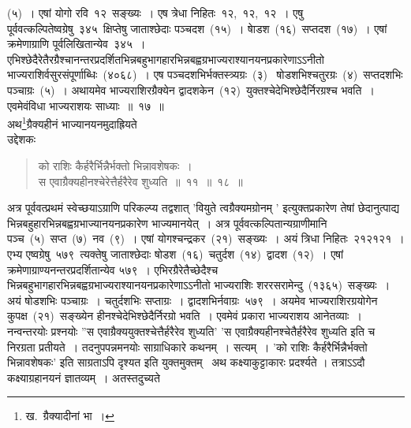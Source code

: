 \documentclass[11pt, openany]{book}
\begin{document}
\noindent
(५)~। एषां योगो रवि~१२~सङ्ख्यः~। एष त्रेधा निहितः~१२,~१२,~१२~। एषु पूर्ववत्कल्पितेष्वग्रेषु~३\textendash४\textendash५~क्षिप्तेषु जाताश्छेदाः पञ्चदश~(१५)~। षाेडश~(१६)~सप्तदश~(१७)~। एषां क्रमेणाग्राणि पूर्वलिखितान्येव~३\textendash४\textendash५~।एभिश्छेदैरेतैरग्रैश्चानन्तरप्रदर्शितभिन्नबहुभागहारभिन्नबह्वग्रभाज्यराश्यानयनप्रकारेणाऽऽनीतो भाज्यराशिर्वसुरसंपूर्णाब्धिः~(४०६८)~। एष पञ्चदशभिर्भक्तस्त्र्यग्रः~(३)~ षोडशभिश्चतुरग्रः~(४)~सप्तदशभिः पञ्चाग्रः~(५)~। अथायमेव भाज्यराशिरग्रैक्येन द्वादशकेन~(१२)~युक्तश्चेदेभिश्छेदैर्निरग्रश्च भवति~। एवमेवंविधा भाज्यराशयः साध्याः~॥~१७~॥\\

\indent
अथ\renewcommand\thefootnote{१}\footnote{ख.~ग्रैक्यादीनां भा~।}ग्रैक्यहीनं भाज्यानयनमुदाह्रियते\textendash\\

उद्देशकः\textendash
\begin{quote}
{\ku को राशिः कैर्हरैर्भिन्नैर्भक्तो भिन्नावशेषकः~।\\
स एवाग्रैक्यहीनश्चेरेत्तैर्हरैरेव शुध्यति~॥~११~॥~१८~॥}
\end{quote}

\indent
अत्र पूर्ववत्प्रथमं स्वेच्छयाऽग्राणि परिकल्प्य तद्वशात् 'वियुते त्वग्रैक्यमग्रोनम् ' इत्युक्तप्रकारेण तेषां छेदानुत्पाद्य भिन्नबहुहारभिन्नबह्वग्रभाज्यानयनप्रकारेण भाज्यमानयेत्~। अत्र पूर्ववत्कल्पितान्यग्राणीमानि पञ्च~(५)~सप्त~(७)~नव~(९)~। एषां योगश्चन्द्रकर~(२१)~सङ्ख्यः~। अयं त्रिधा निहितः~२१\textendash२१\textendash २१~। एभ्य एष्वग्रेषु~५\textendash७\textendash९~त्यक्तेषु जाताश्छेदाः षोडश~(१६)~चतुर्दश~(१४)~द्वादश~(१२)~। एषां क्रमेणाग्राण्यनन्तरप्रदर्शितान्येव ५\textendash७\textendash ९~। एभिरग्रैरेतैच्छेदैश्च भिन्नबहुभागहारभिन्नबह्वग्रभाज्यराश्यानयनप्रकारेणाऽऽनीतो भाज्यराशिः शररसरामेन्दु~(१३६५)~सङ्ख्यः~। अयं षोडशभिः पञ्चाग्रः~। चतुर्दशभिः सप्ताग्रः~। द्वादशभिर्नवाग्रः~५\textendash७\textendash९~। अयमेव भाज्यराशिरग्रयोगेन कुपक्ष~(२१)~सङ्ख्येन हीनश्चेदेभिश्छेदैर्निरग्रो भवति~। एवमेवं प्रकारा भाज्यराशय आनेतव्याः~। नन्वन्तरयोः प्रश्नयोः ''स एवाग्रैक्ययुक्तश्चेत्तैर्हरैरेव शुध्यति' 'स एवाग्रैक्यहीनश्चेतैर्हरैरेव शुध्यति इति च निरग्रता प्रतीयते~। तदनुपपन्नमनयोः
साग्राधिकारे कथनम्~। सत्यम्~। 'को राशिः कैर्हरैर्भिन्नैर्भक्तो भिन्नावशेषकः' इति साग्रताऽपि दृश्यत इति युक्तमुक्तम् \textendash\ अथ कक्ष्याकुट्टाकारः प्रदर्श्यते ।
तत्राऽऽदौ कक्ष्याग्रहानयनं ज्ञातव्यम्~। अतस्तदुच्यते\textendash



\newpage
\thispagestyle{fancy}
\fancyhf{}
\end{document}
